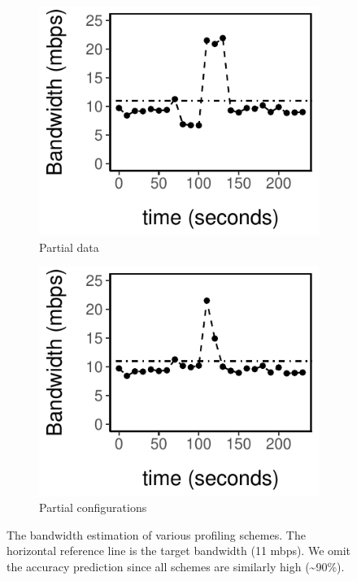 \begin{figure}
  \\
  \vspace{1.5em}
  \begin{subfigure}[t]{0.49\columnwidth}
    \includegraphics[width=\textwidth]{figures/online3.pdf}
    \caption{Partial data}
    \label{fig:online-partial}
  \end{subfigure}
  \hfill
  \begin{subfigure}[t]{0.49\columnwidth}
    \includegraphics[width=\textwidth]{figures/online4.pdf}
    \caption{Partial configurations}
    \label{fig:online-trigger}
  \end{subfigure}
  \caption{The bandwidth estimation of various profiling schemes. The horizontal
    reference line is the target bandwidth (11 mbps). We omit the accuracy
    prediction since all schemes are similarly high (\textasciitilde 90\%).}
  \label{fig:online-tricks}
\end{figure}

